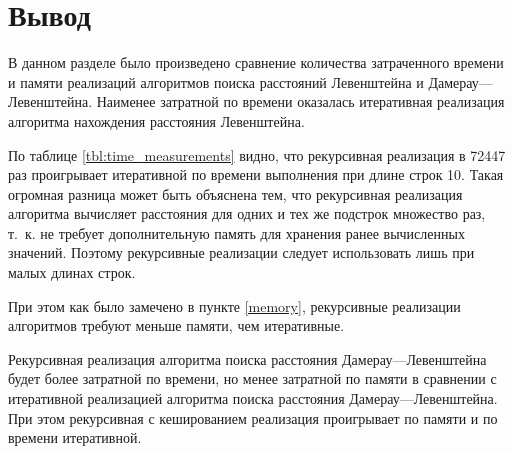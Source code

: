 \clearpage


\section*{Вывод}

В данном разделе было произведено сравнение количества затраченного времени и памяти реализаций алгоритмов поиска расстояний Левенштейна и Дамерау---Левенштейна.
Наименее затратной по времени оказалась итеративная реализация алгоритма нахождения расстояния Левенштейна.

По таблице \ref{tbl:time_measurements} видно, что рекурсивная реализация в 72447 раз проигрывает итеративной по времени выполнения при длине строк 10.
Такая огромная разница может быть объяснена тем, что рекурсивная реализация алгоритма вычисляет расстояния для одних и тех же подстрок множество раз, т.~к. не требует дополнительную память для хранения ранее вычисленных значений.
Поэтому рекурсивные реализации следует использовать лишь при малых длинах строк.

При этом как было замечено в пункте \ref{memory}, рекурсивные реализации алгоритмов требуют меньше памяти, чем итеративные.

Рекурсивная реализация алгоритма поиска расстояния Дамерау---Левенштейна будет более затратной по времени, но менее затратной по памяти в сравнении с итеративной реализацией алгоритма поиска расстояния Дамерау---Левенштейна.
При этом рекурсивная с кешированием реализация проигрывает по памяти и по времени итеративной.